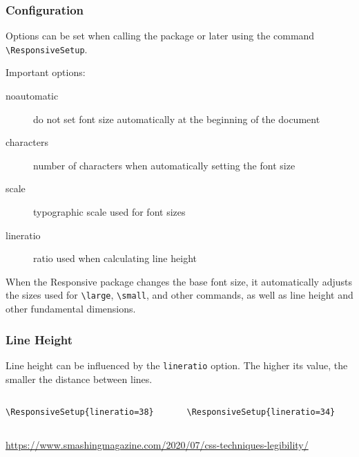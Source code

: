 \begin{frame}[fragile]
  \frametitle{Configuration}
  Options can be set when calling the package or later using the command \verb|\ResponsiveSetup|.

  Important options:

  \begin{description}
    \item[noautomatic] do not set font size automatically at the beginning of the document
    \item[characters] number of characters when automatically setting the font size
    \item[scale] typographic scale used for font sizes
    \item[lineratio] ratio used when calculating line height
  \end{description}

\end{frame}

When the Responsive package changes the base font size, it automatically
adjusts the sizes used for \verb|\large|, \verb|\small|, and other commands, as well as line
height and other fundamental dimensions.

\ifdefined\HCode
  \long{}
\fi

\begin{frame}[fragile]
  \frametitle{Line Height}
  Line height can be influenced by the \texttt{lineratio} option. 
The higher its value, the smaller the distance between lines.

\begin{columns}
  \begin{column}{0.5\textwidth}
\begin{verbatim}
\ResponsiveSetup{lineratio=38}
\end{verbatim}

\end{column}
  \begin{column}{0.5\textwidth}
\begin{verbatim}
\ResponsiveSetup{lineratio=34}
\end{verbatim}

\end{column}
\end{columns}

\url{https://www.smashingmagazine.com/2020/07/css-techniques-legibility/}

\end{frame}

